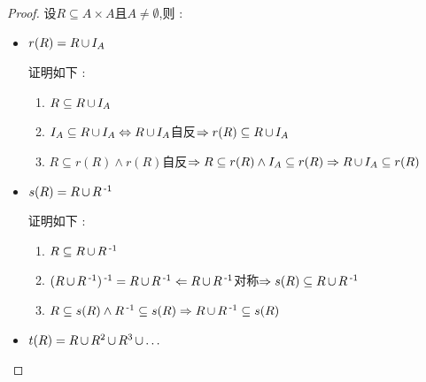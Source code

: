 {{{  \begin{proof}
    设$R \subseteq A \times A$且$A \neq \emptyset$,则 : \begin{itemize}
      \item {
            $r(R) = R \operatorname{\cup} I_A$

            证明如下 :\begin{enumerate}
              \item $R \subseteq R \operatorname{\cup} I_A$
              \item $I_A \subseteq R \operatorname{\cup} I_A \Leftrightarrow R \operatorname{\cup} I_A$自反$\Rightarrow r(R) \subseteq R \operatorname{\cup} I_A$
              \item $R \subseteq r(R) \land r(R)$自反$\Rightarrow R \subseteq r(R) \land I_A \subseteq r(R) \Rightarrow R \operatorname{\cup} I_A \subseteq r(R)$
            \end{enumerate}
            }
      \item {
            $s(R) = R \operatorname{\cup} R\operatorname{^{-1}}$

            证明如下 : \begin{enumerate}
              \item $R \subseteq R \operatorname{\cup} R\operatorname{^{-1}}$
              \item $(R \operatorname{\cup} R\operatorname{^{-1}})\operatorname{^{-1}} = R \operatorname{\cup} R\operatorname{^{-1}} \Leftarrow R \operatorname{\cup} R\operatorname{^{-1}}$对称$\Rightarrow s(R) \subseteq R \operatorname{\cup} R\operatorname{^{-1}}$
              \item $R \subseteq s(R) \land R\operatorname{^{-1}} \subseteq s(R) \Rightarrow R \operatorname{\cup} R\operatorname{^{-1}} \subseteq s(R)$
            \end{enumerate}
            }
      \item {
            $t(R) = R \operatorname{\cup} R^2 \operatorname{\cup} R^3 \operatorname{\cup} \dots$

}
\end{itemize}
\end{proof}}}}
